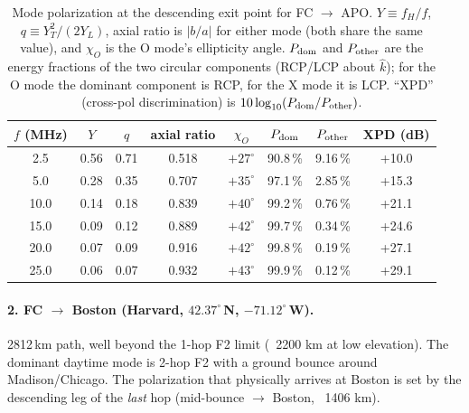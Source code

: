 \documentclass[11pt]{article}
\begin{document}
\begin{table}[h]\centering
\small
\begin{tabular}{cccccccc}
\toprule
$f$ (MHz) & $Y$ & $q$ & axial ratio & $\chi_O$ & $P_{\rm dom}$ & $P_{\rm other}$ & XPD (dB) \\
\midrule
 2.5  & 0.56 & 0.71 & 0.518 & $+27^\circ$ & 90.8\,\% & 9.16\,\%  & +10.0 \\
 5.0  & 0.28 & 0.35 & 0.707 & $+35^\circ$ & 97.1\,\% & 2.85\,\%  & +15.3 \\
10.0  & 0.14 & 0.18 & 0.839 & $+40^\circ$ & 99.2\,\% & 0.76\,\%  & +21.1 \\
15.0  & 0.09 & 0.12 & 0.889 & $+42^\circ$ & 99.7\,\% & 0.34\,\%  & +24.6 \\
20.0  & 0.07 & 0.09 & 0.916 & $+42^\circ$ & 99.8\,\% & 0.19\,\%  & +27.1 \\
25.0  & 0.06 & 0.07 & 0.932 & $+43^\circ$ & 99.9\,\% & 0.12\,\%  & +29.1 \\
\bottomrule
\end{tabular}
\caption{Mode polarization at the descending exit point for FC $\to$
APO.  $Y \equiv f_H/f$, $q \equiv Y_T^2/(2 Y_L)$, axial ratio is
$|b/a|$ for either mode (both share the same value), and
$\chi_O$ is the O mode's ellipticity angle.
$P_{\rm dom}$ and $P_{\rm other}$ are the energy fractions of the
two circular components (RCP/LCP about $\hat k$); for the O mode
the dominant component is RCP, for the X mode it is LCP.
``XPD'' (cross-pol discrimination) is
$10\log_{10}(P_{\rm dom}/P_{\rm other})$.}
\end{table}

\paragraph{2.  FC $\to$ Boston (Harvard, $42.37^\circ$\,N,
$-71.12^\circ$\,W).}
2812\,km path, well beyond the 1-hop F2 limit (~2200 km at low
elevation).  The dominant daytime mode is 2-hop F2 with a ground
bounce around Madison/Chicago.  The polarization that physically
arrives at Boston is set by the descending leg of the
\emph{last} hop (mid-bounce $\to$ Boston, ~1406 km).
\end{document}
